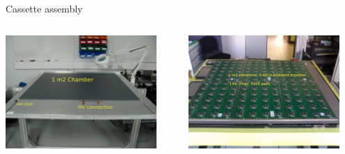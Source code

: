 \documentclass[10pt]{beamer}
\begin{document}
\begin{frame}{Cassette assembly}
\begin{columns}
      \begin{column}{0.5\textwidth}

        \centerline{\includegraphics[width=0.9\textwidth]{jpg/ConstructionRPC}}
      \end{column}
\pause
      \begin{column}{0.5\textwidth}


        \centerline{\includegraphics[width=0.9\textwidth]{jpg/1m2HR2}}
      \end{column}
    \end{columns}
\begin{columns}
\pause

      \begin{column}{0.5\textwidth}


\end{column}
\end{columns}
\end{frame}
\end{document}
